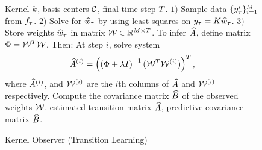 \begin{figure}[t!]
	\centering
	\begin{algorithm}[H]
		\caption{Kernel Observer (Transition Learning)}
		\label{alg:egp_trans}
		\begin{algorithmic}
				 Kernel $k$, basis centers $\mathcal{C}$, final time 
				step $T$. 
				\WHILE{$\tindex \leq \ftime$}
				\STATE $1)$ Sample data $\{y^i_{\tau}\}_{i=1}^{M}$ from $f_{\tau}$. 
				\STATE $2)$ Solve for $\widehat{w}_\tau$ by using least squares on $y_{\tau} = K \widehat{w}_{\tau}$. 
				\STATE $3)$ Store weights $\widehat{w}_\tau$ in matrix $\mathcal{W}\in\mathbb{R}^{M\times T}$.
				\ENDWHILE
				\STATE To infer $\widehat{A}$, define matrix $\Phi = \mathcal{W}^T\mathcal{W}$. Then:
				\STATE At step $i$, solve system
				\begin{align}
				\widehat{A}^{(i)} = \left(\left(\Phi + \lambda I\right)^{-1}(\mathcal{W}^T\mathcal{W}^{(i)})\right)^T,
				\end{align}
				where $\widehat{A}^{(i)}$, and $\mathcal{W}^{(i)}$ are the $i$th columns of $\widehat{A}$ and $\mathcal{W}^{(i)}$ respectively. 
				\ENDFOR
				\STATE Compute the covariance matrix  $\widehat{B}$ of the observed 
				weights $\mathcal{W}$. 
				 estimated transition matrix $\widehat{A}$, predictive covariance    
				matrix $\widehat{B}$. 
		\end{algorithmic}
	\end{algorithm}
	\vspace{-0.3in}
\end{figure}

